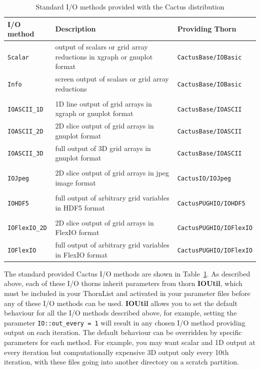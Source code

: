 \documentclass{article}
\begin{document}
\begin{table}
\begin{center}
\begin{tabular}{|l|l|l|}
  \hline
  {\bf I/O method} & {\bf Description} & {\bf Providing Thorn}\\
  \hline
  {\tt Scalar} &
  output of scalars or grid array reductions in xgraph or gnuplot format &
  {\tt CactusBase/IOBasic}
\\
  {\tt Info}      &
  screen output of scalars or grid array reductions &
  {\tt CactusBase/IOBasic}
\\
&&\\
  {\tt IOASCII\_1D} &
  1D line output of grid arrays in xgraph or gnuplot format &
  {\tt CactusBase/IOASCII}
\\
  {\tt IOASCII\_2D} &
  2D slice output of grid arrays in gnuplot format &
  {\tt CactusBase/IOASCII}
\\
  {\tt IOASCII\_3D} &
  full output of 3D grid arrays in gnuplot format &
  {\tt CactusBase/IOASCII}
\\
&&\\
  {\tt IOJpeg} &
  2D slice output of grid arrays in jpeg image format &
  {\tt CactusIO/IOJpeg}
\\
&&\\
  {\tt IOHDF5} &
  full output of arbitrary grid variables in HDF5 format &
  {\tt CactusPUGHIO/IOHDF5}
\\
&&\\
  {\tt IOFlexIO\_2D} &
  2D slice output of grid arrays in FlexIO format &
  {\tt CactusPUGHIO/IOFlexIO}
\\
  {\tt IOFlexIO} &
  full output of arbitrary grid variables in FlexIO format &
  {\tt CactusPUGHIO/IOFlexIO}
\\
  \hline
\end{tabular}
\caption{Standard I/O methods provided with the Cactus distribution}
\label{one}
\end{center}
\end{table}

The standard provided Cactus I/O methods are shown in Table~\ref{one}.
As described above, each of these I/O thorns inherit parameters from thorn
{\bf IOUtil}, which must be included in your ThornList
and activated in your parameter files before any of these I/O methods
can be used. {\bf IOUtil} allows you to set the default
behaviour for all the I/O methods described above, for example, setting
the parameter {\tt IO::out\_every = 1} will result in any chosen I/O method
providing output on each iteration. The default behaviour can be overridden
by specific parameters for each method.
For example, you may want scalar and 1D output at every iteration
but computationally expensive 3D output only every 10th iteration,
with these files going into another directory on a scratch partition.
\end{document}
